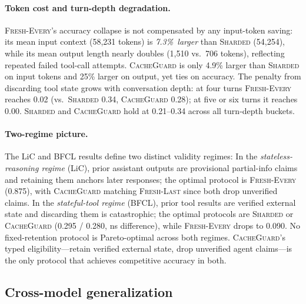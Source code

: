 \documentclass{article}
\begin{document}
\paragraph{Token cost and turn-depth degradation.}
\textsc{Fresh-Every}'s accuracy collapse is not compensated by any input-token saving: its mean input context (58{,}231 tokens) is \emph{7.3\%\ larger} than \textsc{Sharded} (54{,}254), while its mean output length nearly doubles (1{,}510 vs.\ 706 tokens), reflecting repeated failed tool-call attempts. \textsc{CacheGuard} is only 4.9\% larger than \textsc{Sharded} on input tokens and 25\% larger on output, yet ties on accuracy. The penalty from discarding tool state grows with conversation depth: at four turns \textsc{Fresh-Every} reaches 0.02 (vs.\ \textsc{Sharded} 0.34, \textsc{CacheGuard} 0.28); at five or six turns it reaches 0.00. \textsc{Sharded} and \textsc{CacheGuard} hold at 0.21--0.34 across all turn-depth buckets.

\paragraph{Two-regime picture.}
The LiC and BFCL results define two distinct validity regimes:
In the \emph{stateless-reasoning regime} (LiC), prior assistant outputs are provisional partial-info claims and retaining them anchors later responses; the optimal protocol is \textsc{Fresh-Every} (0.875), with \textsc{CacheGuard} matching \textsc{Fresh-Last} since both drop unverified claims. In the \emph{stateful-tool regime} (BFCL), prior tool results are verified external state and discarding them is catastrophic; the optimal protocols are \textsc{Sharded} or \textsc{CacheGuard} (0.295 / 0.280, ns difference), while \textsc{Fresh-Every} drops to 0.090.
No fixed-retention protocol is Pareto-optimal across both regimes. \textsc{CacheGuard}'s typed eligibility---retain verified external state, drop unverified agent claims---is the only protocol that achieves competitive accuracy in both.

\subsection{Cross-model generalization}
\label{sec:cross-model}
\end{document}
